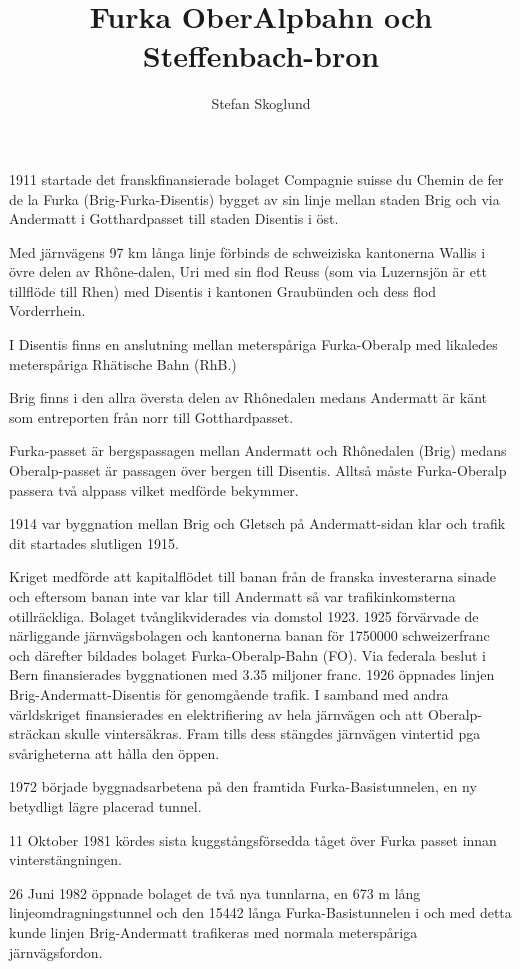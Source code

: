 \documentclass[notitlepage,10pt,swedish,a4paper]{article}
\begin{document}
\title{Furka OberAlpbahn och Steffenbach-bron}
\author{Stefan Skoglund}
\maketitle

1911 startade det franskfinansierade bolaget Compagnie suisse du Chemin de fer de la Furka (Brig-Furka-Ðisentis) bygget
av sin linje mellan staden Brig och via Andermatt i Gotthardpasset till staden Disentis i öst.

Med järnvägens 97 km långa linje förbinds de schweiziska kantonerna Wallis i övre delen av Rhône-dalen, Uri med sin flod Reuss (som via Luzernsjön är ett tillflöde till Rhen) med Disentis i kantonen Graubünden och dess flod Vorderrhein.

I Disentis finns en anslutning mellan meterspåriga Furka-Oberalp med likaledes meterspåriga Rhätische Bahn (RhB.)

Brig finns i den allra översta delen av Rhônedalen medans Andermatt är känt som entreporten från norr till Gotthardpasset.

Furka-passet är bergspassagen mellan Andermatt och Rhônedalen (Brig) medans Oberalp-passet är passagen över bergen till Disentis.
Alltså måste Furka-Oberalp passera två alppass vilket medförde bekymmer.

1914 var byggnation mellan Brig och Gletsch på Andermatt-sidan klar och trafik dit startades slutligen 1915.

Kriget medförde att kapitalflödet till banan från de franska investerarna sinade och eftersom banan inte var klar till Andermatt så var trafikinkomsterna otillräckliga. Bolaget tvånglikviderades via domstol 1923.
1925 förvärvade de närliggande järnvägsbolagen och kantonerna banan för 1750000 schweizerfranc och därefter bildades bolaget Furka-Oberalp-Bahn (FO). Via federala beslut i Bern finansierades byggnationen med 3.35 miljoner franc.
1926 öppnades linjen Brig-Andermatt-Disentis för genomgående trafik.
I samband med andra världskriget finansierades en elektrifiering av hela järnvägen och att Oberalp-sträckan skulle vintersäkras. Fram tills dess stängdes järnvägen vintertid pga svårigheterna att hålla den öppen.

1972 började byggnadsarbetena på den framtida Furka-Basistunnelen, en ny betydligt lägre placerad tunnel.

11 Oktober 1981 kördes sista kuggstångsförsedda tåget över Furka passet innan vinterstängningen.

26 Juni 1982 öppnade bolaget de två nya tunnlarna, en 673 m lång linjeomdragningstunnel och den 15442 långa Furka-Basistunnelen i och med detta kunde linjen Brig-Andermatt trafikeras med normala meterspåriga järnvägsfordon.
\end{document}
